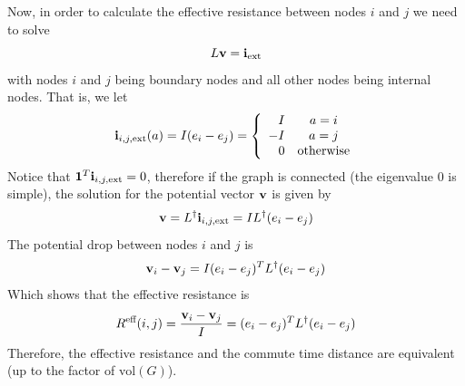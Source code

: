 Now, in order to calculate the effective resistance between nodes $i$ and $j$ we need to solve
\begin{equation}
L\mathbf{v} = \mathbf{i}_{\text{ext}}  
\end{equation} 
with nodes $i$ and $j$ being boundary nodes and all other nodes being internal nodes. That is, we let
$$\mathbf{i}_{i,j,\text{ext}}(a) = I (e_i - e_j) = \left\{\begin{array}{rc}
                                    I & a=i \\
                                    -I & a=j \\
                                    0 & \text{otherwise} 
                                  \end{array}
 \right.$$
Notice that $\mathbf{1}^T \mathbf{i}_{i,j,\text{ext}}=0$, therefore if the graph is connected (the eigenvalue 0 is simple), the solution for the potential vector $\mathbf{v}$ is given by
\begin{equation}
\mathbf{v} = L^\dagger \mathbf{i}_{i,j,\text{ext}} = I L^\dagger(e_i - e_j)
\end{equation} 
The potential drop between nodes $i$ and $j$ is
\begin{equation}
\mathbf{v}_i - \mathbf{v}_j =  I (e_i - e_j)^T L^\dagger (e_i - e_j)
\end{equation}
Which shows that the effective resistance is 
\begin{equation}
R^{\text{eff}}(i,j) = \frac{\mathbf{v}_i - \mathbf{v}_j}{I} = (e_i - e_j)^T L^\dagger(e_i - e_j)
\end{equation}
Therefore, the effective resistance and the commute time distance are equivalent (up to the factor of $\text{vol}(G)$). 


